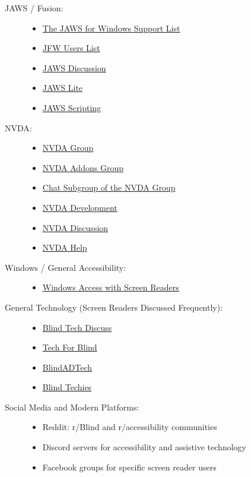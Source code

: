 \begin{description}
    \item[JAWS / Fusion:]
    \begin{itemize}
        \item \href{https://groups.io/g/jfw/}{The JAWS for Windows Support List}
        \item \href{https://groups.io/g/jfw-users/}{JFW Users List}
        \item \href{https://groups.io/g/jawsdiscussion/}{JAWS Discussion}
        \item \href{https://groups.io/g/jawslite/}{JAWS Lite}
        \item \href{https://groups.io/g/jawsscripting/}{JAWS Scripting}
    \end{itemize}
    \item[NVDA:]
    \begin{itemize}
        \item \href{https://nvda.groups.io/g/nvda/}{NVDA Group}
        \item \href{https://nvda-addons.groups.io/g/nvda-addons}{NVDA Addons Group}
        \item \href{https://nvda.groups.io/g/chat/}{Chat Subgroup of the NVDA Group}
        \item \href{https://groups.io/g/nvda-devel/}{NVDA Development}
        \item \href{https://groups.io/g/nvdadiscussion/}{NVDA Discussion}
        \item \href{https://groups.io/g/NVDAhelp/}{NVDA Help}
    \end{itemize}
    \item[Windows / General Accessibility:]
    \begin{itemize}
        \item \href{https://winaccess.groups.io/g/winaccess}{Windows Access with Screen Readers}
    \end{itemize}
    \item[General Technology (Screen Readers Discussed Frequently):]
    \begin{itemize}
        \item \href{https://groups.io/g/blindtechdiscuss/}{Blind Tech Discuss}
        \item \href{https://groups.io/g/tech-for-blind}{Tech For Blind}
        \item \href{https://groups.io/g/blindadtech}{BlindADTech}
        \item \href{https://groups.io/g/blind-techies/}{Blind Techies}
    \end{itemize}
    \item[Social Media and Modern Platforms:]
    \begin{itemize}
        \item Reddit: r/Blind and r/accessibility communities
        \item Discord servers for accessibility and assistive technology
        \item Facebook groups for specific screen reader users
    \end{itemize}
\end{description}


